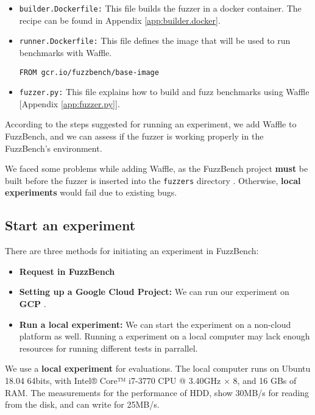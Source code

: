 \begin{itemize}
    \item \texttt{builder.Dockerfile:} This file builds the fuzzer in a docker container. The recipe can be found in Appendix \ref{app:builder.docker}.
    \item \texttt{runner.Dockerfile:} This file defines the image that will be used to run benchmarks with Waffle.
\begin{lstlisting}[language=docker-compose,style=CodeStyle]
FROM gcr.io/fuzzbench/base-image
\end{lstlisting}  
    \item \texttt{fuzzer.py:} This file explains how to build and fuzz benchmarks using Waffle [Appendix \ref{app:fuzzer.py}].
\end{itemize}

According to the steps suggested for running an experiment, we add Waffle to FuzzBench, and we can assess if the fuzzer is working properly in the FuzzBench's environment.



We faced some problems while adding Waffle, as the FuzzBench project \textbf{must} be built before the fuzzer is inserted into the \texttt{fuzzers} directory \cite{error0612}. Otherwise, \textbf{local experiments} would fail due to existing bugs.

\subsection*{Start an experiment}

There are three methods for initiating an experiment in FuzzBench:

\begin{itemize}
    \item \textbf{Request in FuzzBench} 
    \item \textbf{Setting up a Google Cloud Project:} We can run our experiment on \textbf{GCP} \cite{request_gcp}.
    \item \textbf{Run a local experiment:} We can start the experiment on a non-cloud platform as well. Running a experiment on a local computer may lack enough resources for running different tests in parrallel.
\end{itemize}

We use a \textbf{local experiment} for evaluations. The local computer runs on Ubuntu 18.04 64bits, with Intel® Core™ i7-3770 CPU @ 3.40GHz × 8, and 16 GBs of RAM. The measurements for the performance of HDD, show 30MB/s for reading from the disk, and can write for 25MB/s.
